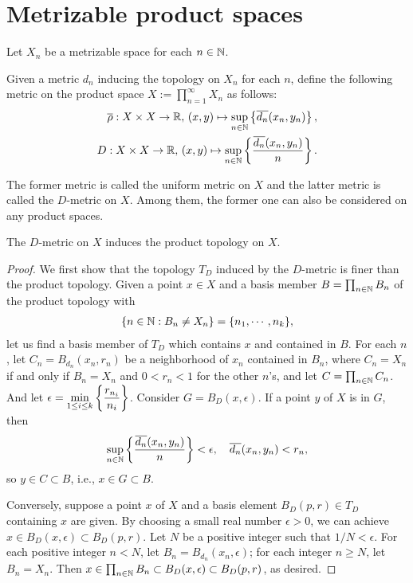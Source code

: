 \section{Metrizable product spaces}

Let $X_n$ be a metrizable space for each $n\in{\mathbb{N}}$.

\begin{nota}
    Given a metric $d_n$ inducing the topology on $X_n$ for each $n$,
    define the following metric on the product space $X:=\prod_{n=1}^\infty X_n$ as follows:
    \begin{align*}
        \overline{\rho}: X\times X\rightarrow{\mathbb{R}},\,(x, y)\mapsto\sup_{n\in{\mathbb{N}}}\left\{\overline{d_n}(x_n, y_n)\right\},\\
        D: X\times X\rightarrow{\mathbb{R}},\,(x, y)\mapsto\sup_{n\in{\mathbb{N}}}\left\{\frac{\overline{d_n}(x_n, y_n)}{n}\right\}.
    \end{align*}
\end{nota}

The former metric is called the uniform metric on $X$ and the latter metric is called the $D$-metric on $X$.
Among them, the former one can also be considered on any product spaces.

\begin{thm}
    The $D$-metric on $X$ induces the product topology on $X$.
\end{thm}

\begin{proof}
    We first show that the topology $T_D$ induced by the $D$-metric is finer than the product topology.
    Given a point $x\in X$ and a basis member $B=\prod_{n\in{\mathbb{N}}}B_n$ of the product topology with
    \begin{align*}
        \displaystyle{\{n\in{\mathbb{N}}:B_n\neq X_n\}=\{n_1, \cdots, n_k\}},
    \end{align*}
    let us find a basis member of $T_D$ which contains $x$ and contained in $B$.
    For each $n$, let $C_n=B_{d_n}(x_n, r_n)$ be a neighborhood of $x_n$ contained in $B_n$, where $C_n=X_n$ if and only if $B_n=X_n$ and $0<r_n<1$ for the other $n$'s, and let $C=\prod_{n\in{\mathbb{N}}}C_n$.
    And let $\displaystyle{\epsilon=\min_{1\leq i\leq k}\left\{\frac{r_{n_i}}{n_i}\right\}}$.
    Consider $G=B_D(x, \epsilon)$.
    If a point $y$ of $X$ is in $G$, then
    \begin{align*}
        \sup_{n\in{\mathbb{N}}}\left\{\frac{\overline{d_n}(x_n, y_n)}{n}\right\} < \epsilon,\quad\overline{d_n}(x_n, y_n) < r_n,
    \end{align*}
    so $y\in C\subset B$, i.e., $x\in G\subset B$.
    
    Conversely, suppose a point $x$ of $X$ and a basis element $B_D(p, r)\in T_D$ containing $x$ are given.
    By choosing a small real number $\epsilon>0$, we can achieve $x\in B_D(x, \epsilon)\subset B_D(p, r)$.
    Let $N$ be a positive integer such that $1/N < \epsilon$.
    For each positive integer $n<N$, let $B_n=B_{d_n}(x_n, \epsilon)$; for each integer $n\geq N$, let $B_n=X_n$.
    Then $x\in\prod_{n\in{\mathbb{N}}}B_n\subset B_D(x, \epsilon)\subset B_D(p, r)$, as desired.
\end{proof}


